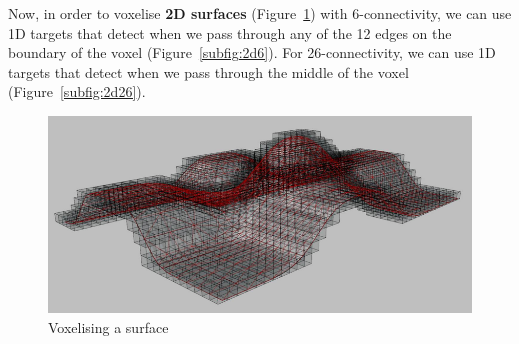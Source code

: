 Now, in order to voxelise \textbf{2D surfaces} (Figure~\ref{fig:surfaces}) with 6-connectivity, we can use 1D targets that detect when we pass through any of the 12 edges on the boundary of the voxel (Figure~\ref{subfig:2d6}).
For 26-connectivity, we can use 1D targets that detect when we pass through the middle of the voxel (Figure~\ref{subfig:2d26}).

\begin{figure}
\centering
\includegraphics[width=\linewidth]{figs/surfaces}
\caption{Voxelising a surface}%
\label{fig:surfaces}
\end{figure}

